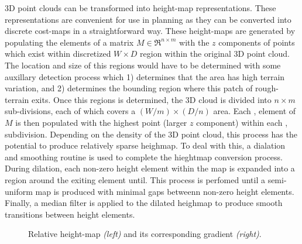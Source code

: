 				3D point clouds can be transformed into height-map representations. These representations are convenient for use in planning as they can be converted into discrete cost-maps in a straightforward way. These height-maps are generated by populating the elements of a matrix  $M\in \Re^{n\times m}$ with the $z$ components of points which exist within discretized $W\times D$ region within the original 3D point cloud. The location and size of this regions would have to be determined with some auxillary detection process which 1) determines that the area has high terrain variation, and 2) determines the bounding region where this patch of rough-terrain exits. Once this regions is determined, the 3D cloud is divided into $n\times m$ sub-divisions, each of which covers a $(W/m) \times (D/n)$ area. Each \Ith, \Jth element of $M$ is then populated with the highest point (larger  $z$ component) within each  \Ith, \Jth subdivision. Depending on the density of the 3D point cloud, this process has the potential to produce relatively sparse heighmap. To deal with this, a dialation and smoothing routine is used to complete the hieghtmap conversion process. During dilation, each non-zero height element within the map is expanded into a region around the exiting element until. This process is perfomed until a semi-uniform map is produced with minimal gaps betweenn non-zero height elements. Finally, a median filter is applied to the dilated heighmap to produce smooth transitions between height elements.
				\begin{figure}[t!]
					\centering
					\caption{Relative height-map \emph{(left)} and its corresponding gradient \emph{(right)}.}
					\label{fig::heightmap_terrain_patch}
				\end{figure}
